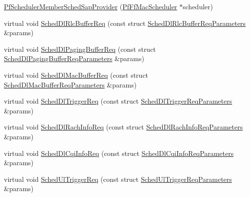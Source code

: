 \begin{DoxyCompactItemize}
\item 
\hyperlink{classns3_1_1PfSchedulerMemberSchedSapProvider_a242c88e8c3713f6782a3f3dd67bf0523}{Pf\+Scheduler\+Member\+Sched\+Sap\+Provider} (\hyperlink{classns3_1_1PfFfMacScheduler}{Pf\+Ff\+Mac\+Scheduler} $\ast$scheduler)
\item 
virtual void \hyperlink{classns3_1_1PfSchedulerMemberSchedSapProvider_a44bec9fc2b15ce2a5033fe3efa86ba94}{Sched\+Dl\+Rlc\+Buffer\+Req} (const struct \hyperlink{structns3_1_1FfMacSchedSapProvider_1_1SchedDlRlcBufferReqParameters}{Sched\+Dl\+Rlc\+Buffer\+Req\+Parameters} \&params)
\item 
virtual void \hyperlink{classns3_1_1PfSchedulerMemberSchedSapProvider_ab713d6e7a2418bc2f9e54228be5aacc5}{Sched\+Dl\+Paging\+Buffer\+Req} (const struct \hyperlink{structns3_1_1FfMacSchedSapProvider_1_1SchedDlPagingBufferReqParameters}{Sched\+Dl\+Paging\+Buffer\+Req\+Parameters} \&params)
\item 
virtual void \hyperlink{classns3_1_1PfSchedulerMemberSchedSapProvider_a531956fa2a4038d1cd60e52e89ef2c7c}{Sched\+Dl\+Mac\+Buffer\+Req} (const struct \hyperlink{structns3_1_1FfMacSchedSapProvider_1_1SchedDlMacBufferReqParameters}{Sched\+Dl\+Mac\+Buffer\+Req\+Parameters} \&params)
\item 
virtual void \hyperlink{classns3_1_1PfSchedulerMemberSchedSapProvider_aae474f68da3c8f77349f21f7df56c0a0}{Sched\+Dl\+Trigger\+Req} (const struct \hyperlink{structns3_1_1FfMacSchedSapProvider_1_1SchedDlTriggerReqParameters}{Sched\+Dl\+Trigger\+Req\+Parameters} \&params)
\item 
virtual void \hyperlink{classns3_1_1PfSchedulerMemberSchedSapProvider_a396a52c73be89c183b6b698b78cf56e9}{Sched\+Dl\+Rach\+Info\+Req} (const struct \hyperlink{structns3_1_1FfMacSchedSapProvider_1_1SchedDlRachInfoReqParameters}{Sched\+Dl\+Rach\+Info\+Req\+Parameters} \&params)
\item 
virtual void \hyperlink{classns3_1_1PfSchedulerMemberSchedSapProvider_a23fe790273ccdd4f4c86f10edafa59e6}{Sched\+Dl\+Cqi\+Info\+Req} (const struct \hyperlink{structns3_1_1FfMacSchedSapProvider_1_1SchedDlCqiInfoReqParameters}{Sched\+Dl\+Cqi\+Info\+Req\+Parameters} \&params)
\item 
virtual void \hyperlink{classns3_1_1PfSchedulerMemberSchedSapProvider_a71e105577bf1196c7ef08511d5bc2e88}{Sched\+Ul\+Trigger\+Req} (const struct \hyperlink{structns3_1_1FfMacSchedSapProvider_1_1SchedUlTriggerReqParameters}{Sched\+Ul\+Trigger\+Req\+Parameters} \&params)
\item 

\end{DoxyCompactItemize}
